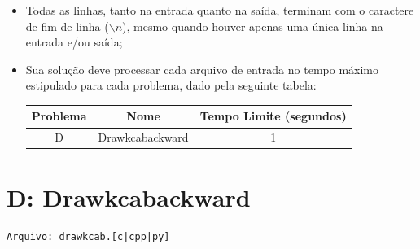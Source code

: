 \documentclass[12pt,oneside]{article} %
\begin{document}
\begin{itemize}
    \item Todas as linhas, tanto na entrada quanto na saída, terminam com o
    caractere de fim-de-linha ($\backslash n$), mesmo quando houver apenas uma única
    linha na entrada e/ou saída;

    \item Sua solução deve processar cada arquivo de entrada no tempo máximo
    estipulado para cada problema, dado pela seguinte tabela:

    \begin{table}[h]
    \centering
    \begin{tabular}{|c|c||c|}
    \hline
    \textbf{Problema} & \textbf{Nome} & \textbf{Tempo Limite (segundos)} \\
    \hline
    D & Drawkcabackward & 1 \\
    \hline
    \end{tabular}
    \end{table}

\end{itemize}

\newpage
\section*{D: Drawkcabackward } %
\vspace{-0.52cm}
\noindent \begin{verbatim}Arquivo: drawkcab.[c|cpp|py]\end{verbatim}

\end{document}
